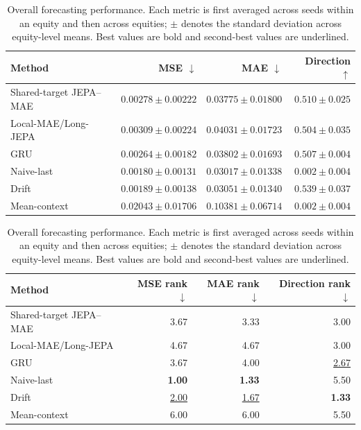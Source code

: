 \begin{table}[t]
\centering
\small
\caption{Overall forecasting performance. Each metric is first averaged across seeds within an equity and then across equities; $\pm$ denotes the standard deviation across equity-level means. Best values are bold and second-best values are underlined.}
\label{tab:main_metrics}
\begin{tabular}{lrrr}
\toprule
Method & MSE $\downarrow$ & MAE $\downarrow$ & Direction $\uparrow$ \\
\midrule
Shared-target JEPA--MAE & $0.00278 \pm 0.00222$ & $0.03775 \pm 0.01800$ & \underline{$0.510 \pm 0.025$} \\
Local-MAE/Long-JEPA & $0.00309 \pm 0.00224$ & $0.04031 \pm 0.01723$ & $0.504 \pm 0.035$ \\
GRU & $0.00264 \pm 0.00182$ & $0.03802 \pm 0.01693$ & $0.507 \pm 0.004$ \\
Naive-last & \textbf{$0.00180 \pm 0.00131$} & \textbf{$0.03017 \pm 0.01338$} & $0.002 \pm 0.004$ \\
Drift & \underline{$0.00189 \pm 0.00138$} & \underline{$0.03051 \pm 0.01340$} & \textbf{$0.539 \pm 0.037$} \\
Mean-context & $0.02043 \pm 0.01706$ & $0.10381 \pm 0.06714$ & $0.002 \pm 0.004$ \\
\bottomrule
\end{tabular}
\par\medskip
\begin{tabular}{lrrr}
\toprule
Method & MSE rank $\downarrow$ & MAE rank $\downarrow$ & Direction rank $\downarrow$ \\
\midrule
Shared-target JEPA--MAE & 3.67 & 3.33 & 3.00 \\
Local-MAE/Long-JEPA & 4.67 & 4.67 & 3.00 \\
GRU & 3.67 & 4.00 & \underline{2.67} \\
Naive-last & \textbf{1.00} & \textbf{1.33} & 5.50 \\
Drift & \underline{2.00} & \underline{1.67} & \textbf{1.33} \\
Mean-context & 6.00 & 6.00 & 5.50 \\
\bottomrule
\end{tabular}
\end{table}
